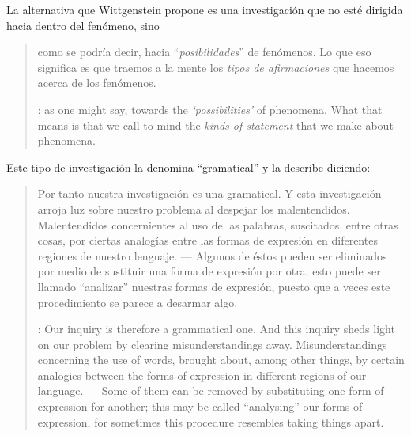 La alternativa que Wittgenstein propone es una investigación que no esté
dirigida hacia dentro del fenómeno, sino
\blockquote[{\cite[\S90]{wittgenstein1953phiinv}}: as one might say, towards the
\emph{`possibilities'} of phenomena. What that means is that we call to mind the
\emph{kinds of statement} that we make about phenomena.]{como se podría decir,
  hacia \enquote{\emph{posibilidades}} de fenómenos. Lo que eso significa es que
  traemos a la mente los \emph{tipos de afirmaciones} que hacemos acerca de los
  fenómenos.}
Este tipo de investigación la denomina \enquote{gramatical} y la describe
diciendo:
\blockquote[{\cite[\S90]{wittgenstein1953phiinv}}: Our inquiry is therefore a
grammatical one. And this inquiry sheds light on our problem by clearing
misunderstandings away. Misunderstandings concerning the use of words, brought
about, among other things, by certain analogies between the forms of expression
in different regions of our language. --- Some of them can be removed by
substituting one form of expression for another; this may be called
\enquote{analysing} our forms of expression, for sometimes this procedure
resembles taking things apart.]{Por tanto nuestra investigación es una
  gramatical. Y esta investigación arroja luz sobre nuestro problema al despejar
  los malentendidos. Malentendidos concernientes al uso de las palabras,
  suscitados, entre otras cosas, por ciertas analogías entre las formas de
  expresión en diferentes regiones de nuestro lenguaje. --- Algunos de éstos
  pueden ser eliminados por medio de sustituir una forma de expresión por otra;
  esto puede ser llamado \enquote{analizar} nuestras formas de expresión, puesto
  que a veces este procedimiento se parece a desarmar algo.}

